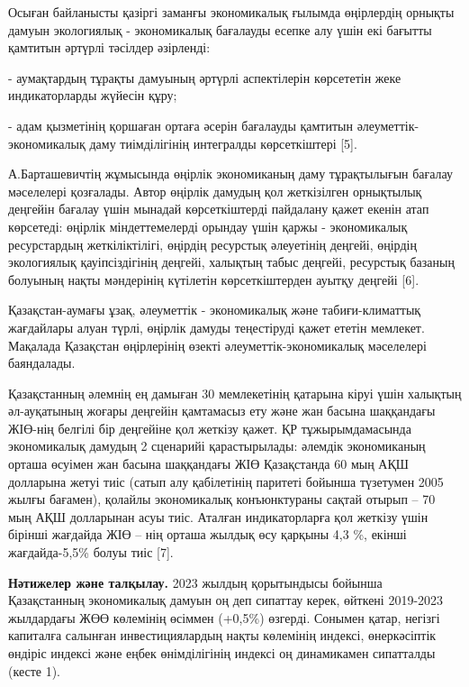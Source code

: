 \begin{multicols}{2}
Осыған байланысты қазіргі заманғы экономикалық ғылымда өңірлердің
орнықты дамуын экологиялық - экономикалық бағалауды есепке алу үшін екі
бағытты қамтитын әртүрлі тәсілдер әзірленді:

- аумақтардың тұрақты дамуының әртүрлі аспектілерін көрсететін жеке
индикаторларды жүйесін құру;

- адам қызметінің қоршаған ортаға әсерін бағалауды қамтитын
әлеуметтік-экономикалық даму тиімділігінің интегралды көрсеткіштері
{[}5{]}.

А.Барташевичтің жұмысында өңірлік экономиканың даму тұрақтылығын бағалау
мәселелері қозғалады. Автор өңірлік дамудың қол жеткізілген орнықтылық
деңгейін бағалау үшін мынадай көрсеткіштерді пайдалану қажет екенін атап
көрсетеді: өңірлік міндеттемелерді орындау үшін қаржы - экономикалық
ресурстардың жеткіліктілігі, өңірдің ресурстық әлеуетінің деңгейі,
өңірдің экологиялық қауіпсіздігінің деңгейі, халықтың табыс деңгейі,
ресурстық базаның болуының нақты мәндерінің күтілетін көрсеткіштерден
ауытқу деңгейі {[}6{]}.

Қазақстан-аумағы ұзақ, әлеуметтік - экономикалық және табиғи-климаттық
жағдайлары алуан түрлі, өңірлік дамуды теңестіруді қажет ететін
мемлекет. Мақалада Қазақстан өңірлерінің өзекті әлеуметтік-экономикалық
мәселелері баяндалады.

Қазақстанның әлемнің ең дамыған 30 мемлекетінің қатарына кіруі үшін
халықтың әл-ауқатының жоғары деңгейін қамтамасыз ету және жан басына
шаққандағы ЖІӨ-нің белгілі бір деңгейіне қол жеткізу қажет. ҚР
тұжырымдамасында экономикалық дамудың 2 сценарийі қарастырылады: әлемдік
экономиканың орташа өсуімен жан басына шаққандағы ЖІӨ Қазақстанда 60 мың
АҚШ долларына жетуі тиіс (сатып алу қабілетінің паритеті бойынша
түзетумен 2005 жылғы бағамен), қолайлы экономикалық конъюнктураны сақтай
отырып -- 70 мың АҚШ долларынан асуы тиіс. Аталған индикаторларға қол
жеткізу үшін бірінші жағдайда ЖІӨ -- нің орташа жылдық өсу қарқыны 4,3
\%, екінші жағдайда-5,5\% болуы тиіс {[}7{]}.

{\bfseries Нәтижелер және талқылау.} 2023 жылдың қорытындысы бойынша
Қазақстанның экономикалық дамуын оң деп сипаттау керек, өйткені
2019-2023 жылдардағы ЖӨӨ көлемінің өсіммен (+0,5\%) өзгерді. Сонымен
қатар, негізгі капиталға салынған инвестициялардың нақты көлемінің
индексі, өнеркәсіптік өндіріс индексі және еңбек өнімділігінің индексі
оң динамикамен сипатталды (кесте 1).
\end{multicols}

